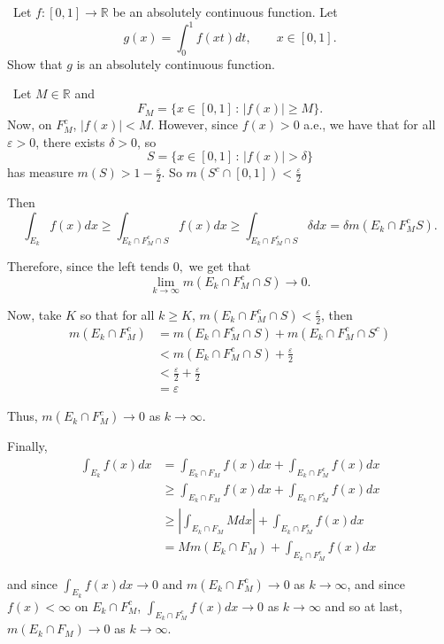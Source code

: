 \documentclass[12pt]{Homework}
\begin{document}
\begin{problem} $\,$
Let $f:[0,1]\to\mathbb{R}$ be an absolutely continuous function. Let $$g(x)=\int_0^1f(xt)dt,\qquad x\in[0,1].$$ Show that $g$ is an absolutely continuous function. 
\end{problem}


\begin{solution}$\,$
Let $M\in\mathbb{R}$ and $$F_M=\{x\in[0,1]\,:\,|f(x)|\ge M\}.$$ Now, on $F_M^c$, $|f(x)|<M$. However, since $f(x)>0$ a.e., we have that for all $\varepsilon>0$, there exists $\delta>0$, so $$S=\{x\in [0,1]\,:\,|f(x)|>\delta\}$$ has measure $m(S)>1-\frac{\varepsilon}{2}$. So $m(S^c\cap[0,1])<\frac{\varepsilon}{2}$

Then $$\int_{E_k}f(x)dx\ge\int_{E_k\cap F_M^c\cap S}f(x)dx\ge\int_{E_k\cap F_M^c\cap S}\delta dx=\delta m(E_k\cap F_M^c S).$$

Therefore, since the left tends $0,$ we get that $$\lim_{k\to\infty}m(E_k\cap F_M^c\cap S)\to0.$$

Now, take $K$ so that for all $k\ge K$, $m(E_k\cap F_M^c\cap S)<\frac{\varepsilon}{2}$, then \begin{align*}
    m(E_k\cap F_M^c)&=m(E_k\cap F_M^c\cap S)+m(E_k\cap F_M^c\cap S^c)\\
    &<m(E_k\cap F_M^c\cap S)+\frac{\varepsilon}{2}\\
    &<\frac{\varepsilon}{2}+\frac{\varepsilon}{2}\\
    &=\varepsilon
\end{align*}

Thus, $m(E_k\cap F_M^c)\to0$ as $k\to\infty.$

Finally,
\begin{align*}
    \int_{E_k}f(x)dx&=\int_{E_k\cap F_M}f(x)dx+\int_{E_k\cap F_M^c}f(x)dx\\
    &\ge\int_{E_k\cap F_M}f(x)dx+\int_{E_k\cap F_M^c}f(x)dx\\
    &\ge\left|\int_{E_k\cap F_M}Mdx\right|+\int_{E_k\cap F_M^c}f(x)dx\\
    &=Mm(E_k\cap F_M)+\int_{E_k\cap F_M^c}f(x)dx
\end{align*}

and since $\displaystyle \int_{E_k}f(x)dx\to0$ and $m(E_k\cap F_M^c)\to0$ as $k\to\infty$, and since $f(x)<\infty$ on $E_k\cap F_M^c$, $\displaystyle \int_{E_k\cap F_M^c}f(x)dx\to0$ as $k\to\infty$ and so at last, $m(E_k\cap F_M)\to0$ as $k\to\infty.$ 
\end{solution}
\newpage
\end{document}
